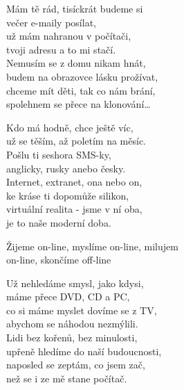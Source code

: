 
\ve{}
Mám tě rád, tisíckrát budeme si \\
večer e-maily posílat, \\
už mám nahranou v počítači, \\
tvoji adresu a to mi stačí. \\
Nemusím se z domu nikam hnát, \\
budem na obrazovce lásku prožívat,\\
chceme mít děti, tak co nám brání, \\
spolehnem se přece na klonování\ldots{} 

\ve{}
Kdo má hodně, chce ještě víc, \\
už se těším, až poletím na měsíc. \\
Pošlu ti seshora SMS-ky, \\
anglicky, rusky anebo česky. \\
Internet, extranet, ona nebo on, \\
ke kráse ti dopomůže silikon, \\
virtuální realita - jsme v ní oba, \\
je to naše moderní doba. 

\cho{}
Žijeme on-line, myslíme on-line, milujem \\
on-line, skončíme off-line 

\ve{}
Už nehledáme smysl, jako kdysi, \\
máme přece DVD, CD a PC, \\
co si máme myslet dovíme se z TV, \\
abychom se náhodou nezmýlili. \\
Lidi bez kořenů, bez minulosti, \\
upřeně hledíme do naší budoucnosti, \\
naposled se zeptám, co jsem zač, \\
než se i ze mě stane počítač. 

\cho{}

\esong{}